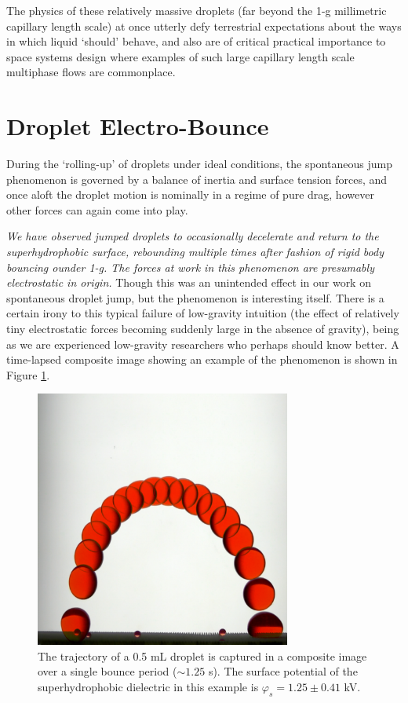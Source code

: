 \documentclass[12pt,a4paper,oneside]{book}
\begin{document}
The physics of these relatively massive droplets (far beyond the 1-g millimetric capillary length scale) at once utterly defy terrestrial expectations about the ways in which liquid `should' behave, and also are of critical practical importance to space systems design where examples of such large capillary length scale multiphase flows are commonplace.

\section{Droplet Electro-Bounce}
During the `rolling-up' of droplets under ideal conditions, the spontaneous jump phenomenon is governed by a balance of inertia and surface tension forces, and once aloft the droplet motion is nominally in a regime of pure drag, however other forces can again come into play. 

\emph{We have observed jumped droplets to occasionally decelerate and return to the superhydrophobic surface, rebounding multiple times after fashion of rigid body bouncing ounder 1-g. The forces at work in this phenomenon are presumably electrostatic in origin.} Though this was an unintended effect in our work on spontaneous droplet jump, but the phenomenon is interesting itself. There is a certain irony to this typical failure of low-gravity intuition (the effect of relatively tiny electrostatic forces becoming suddenly large in the absence of gravity), being as we are experienced low-gravity researchers who perhaps should know better. A time-lapsed composite image showing an example of the phenomenon is shown in Figure \ref{fig:bounce}.
\begin{figure}[htb]
\centering
\includegraphics[width=0.75\textwidth]{bounce}
\caption{The trajectory of a 0.5 mL droplet is captured in a composite image over a single bounce period ($\sim 1.25$ s). The surface potential of the superhydrophobic dielectric in this example is $\varphi_s = 1.25 \pm 0.41$ kV. \label{fig:bounce}}
\end{figure}
\end{document}
